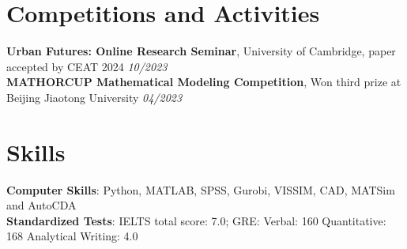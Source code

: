 \documentclass[letterpaper,11pt]{article}
\begin{document}
\section{Competitions and Activities}
\noindent \textbf{Urban Futures: Online Research Seminar}, University of Cambridge, paper accepted by CEAT 2024 \hfill \textit{10/2023}\\
\noindent \textbf{MATHORCUP Mathematical Modeling Competition}, Won third prize at Beijing Jiaotong University \hfill \textit{04/2023}
\vspace{-20pt}

\section{Skills}
\noindent \textbf{Computer Skills}: Python, MATLAB, SPSS, Gurobi, VISSIM, CAD, MATSim and AutoCDA\\
\noindent \textbf{Standardized Tests}: IELTS total score: 7.0; GRE: Verbal: 160 Quantitative: 168 Analytical Writing: 4.0
\vspace{-10pt}
\end{document}
